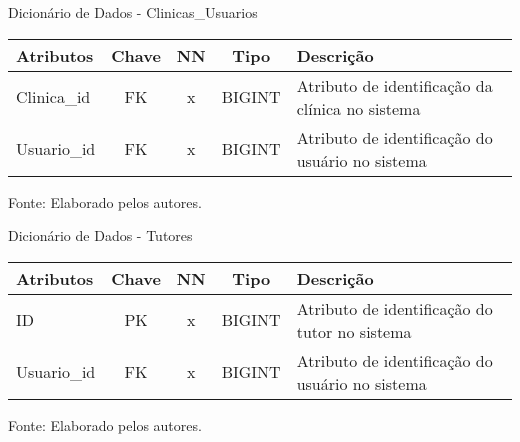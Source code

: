 \documentclass[
    12pt,               %
    openright,          %
    oneside,
    a4paper,            %
    BIBLATEX,           %
    TODO,               %
    english,            %
    brazil              %
    ]{ifsp-spo-inf-ctds}
\begin{document}
    \begin{center}
        \begin{quadro}[H]
        \centering
                \caption{Dicionário de Dados - Clinicas\_Usuarios}
                  \begin{tabulary}{1.0\textwidth}{|p{9em}|c|c|c|p{19em}|}
            \hline
            Atributos & Chave & NN & Tipo & Descrição\\
            \hline
            Clinica\_id & FK & x & BIGINT & Atributo de identificação da clínica no sistema \\
            \hline
            Usuario\_id & FK & x & BIGINT & Atributo de identificação do usuário no sistema\\
            \hline
            \end{tabulary}

                \label{qd: md-clinica-usuarios}
                \centering
        {\footnotesize Fonte: Elaborado pelos autores.}
              \end{quadro}
            \end{center}      

    \begin{center}
        \begin{quadro}[H]
        \centering
                \caption{Dicionário de Dados - Tutores}
                  \begin{tabulary}{1.0\textwidth}{|p{9em}|c|c|c|p{19em}|}
            \hline
            Atributos & Chave & NN & Tipo & Descrição\\
            \hline
            ID & PK & x & BIGINT & Atributo de identificação do tutor no sistema \\
            \hline
            Usuario\_id & FK & x & BIGINT & Atributo de identificação do usuário no sistema\\
            \hline
            \end{tabulary}

                \label{qd: md-tutor}
                \centering
        {\footnotesize Fonte: Elaborado pelos autores.}
              \end{quadro}
            \end{center}
\end{document}
